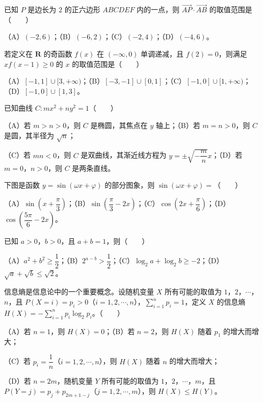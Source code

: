 \begin{question}
已知 $P$ 是边长为 $2$ 的正六边形 $ABCDEF$ 内的一点，则 $\overrightarrow{AP}\cdot\overrightarrow{AB}$ 的取值范围是\mbox{（　　）}

（A）$(-2,6)$；（B）$(-6,2)$；（C）$(-2,4)$；（D）$(-4,6)$。

\end{question}
\begin{question}
若定义在 $\mathbf R$ 的奇函数 $f(x)$ 在 $(-\infty,0)$ 单调递减，且 $f(2)=0$，则满足 $xf(x-1)\geqslant0$ 的 $x$ 的取值范围是\mbox{（　　）}

（A）$[-1,1]\cup[3,+\infty)$；（B）$[-3,-1]\cup[0,1]$；（C）$[-1,0]\cup[1,+\infty)$；（D）$[-1,0]\cup[1,3]$。

\end{question}

\begin{question}
已知曲线 $C:mx^2+ny^2=1$\mbox{（　　）}

（A）若 $m>n>0$，则 $C$ 是椭圆，其焦点在 $y$ 轴上；（B）若 $m=n>0$，则 $C$ 是圆，其半径为 $\sqrt n$；

（C）若 $mn<0$，则 $C$ 是双曲线，其渐近线方程为 $y=\pm\sqrt{-\dfrac mn}x$；（D）若 $m=0$，$n>0$，则 $C$ 是两条直线。

\Needspace{0.4\textheight}
\end{question}
\begin{question}
下图是函数 $y=\sin(\omega x+\varphi)$ 的部分图象，则 $\sin(\omega x+\varphi)=$\mbox{（　　）}
\nopagebreak[4]
\begin{center}\end{center}
\nopagebreak[4]
（A）$\sin\left(x+\dfrac\pi3\right)$；（B）$\sin\left(\dfrac\pi3-2x\right)$；（C）$\cos\left(2x+\dfrac\pi6\right)$；（D）$\cos\left(\dfrac{5\pi}6-2x\right)$。

\end{question}
\begin{question}
已知 $a>0$，$b>0$，且 $a+b=1$，则\mbox{（　　）}

（A）$a^2+b^2\geqslant\dfrac12$；（B）$2^{a-b}>\dfrac12$；（C）$\log_2a+\log_2b\geqslant-2$；（D）$\sqrt a+\sqrt b\leqslant\sqrt2$。

\end{question}
\begin{question}
信息熵是信息论中的一个重要概念。设随机变量 $X$ 所有可能的取值为 $1$，$2$，$\cdots$，$n$，且 $P(X=i)=p_i>0$（$i=1,2,\cdots,n$），$\sum\limits_{i=1}^n p_i=1$，定义 $X$ 的信息熵 $H(X)=-\sum\limits_{i=1}^n p_i\log_2p_i$。\mbox{（　　）}

（A）若 $n=1$，则 $H(X)=0$；（B）若 $n=2$，则 $H(X)$ 随着 $p_1$ 的增大而增大；

（C）若 $p_i=\dfrac1n$（$i=1,2,\cdots,n$），则 $H(X)$ 随着 $n$ 的增大而增大；

（D）若 $n=2m$，随机变量 $Y$ 所有可能的取值为 $1$，$2$，$\cdots$，$m$，且 $P(Y=j)=p_j+p_{2m+1-j}$（$j=1,2,\cdots,m$），则 $H(X)\leqslant H(Y)$。

\end{question}

